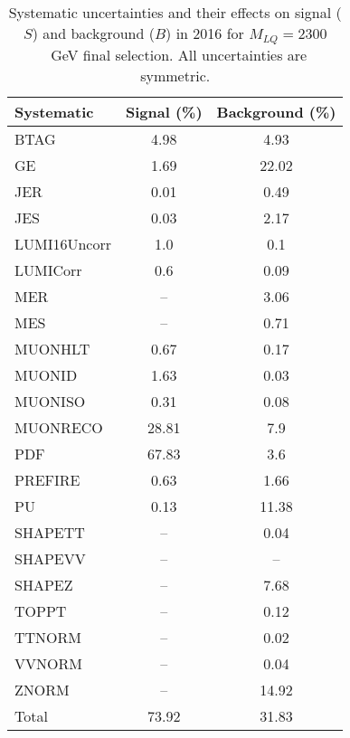 \begin{table}[htbp]
\begin{center}
\caption{Systematic uncertainties and their effects on signal ($S$) and background ($B$) in 2016 for $M_{LQ}=2300$~GeV final selection. All uncertainties are symmetric.}
\begin{tabular}{lcc}
\hline\hline
Systematic & Signal (\%) & Background (\%) \\ \hline 
BTAG & 4.98 & 4.93\\ 
GE & 1.69 & 22.02\\ 
JER & 0.01 & 0.49\\ 
JES & 0.03 & 2.17\\ 
LUMI16Uncorr & 1.0 & 0.1\\ 
LUMICorr & 0.6 & 0.09\\ 
MER & -- & 3.06\\ 
MES & -- & 0.71\\ 
MUONHLT & 0.67 & 0.17\\ 
MUONID & 1.63 & 0.03\\ 
MUONISO & 0.31 & 0.08\\ 
MUONRECO & 28.81 & 7.9\\ 
PDF & 67.83 & 3.6\\ 
PREFIRE & 0.63 & 1.66\\ 
PU & 0.13 & 11.38\\ 
SHAPETT & -- & 0.04\\ 
SHAPEVV & -- & --\\ 
SHAPEZ & -- & 7.68\\ 
TOPPT & -- & 0.12\\ 
TTNORM & -- & 0.02\\ 
VVNORM & -- & 0.04\\ 
ZNORM & -- & 14.92\\ 
Total & 73.92 & 31.83\\ \hline \hline
\end{tabular}
\label{tab:SysUncertainties_uujj_2300}
\end{center}
\end{table}

